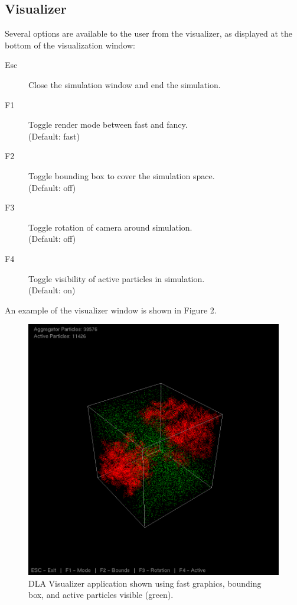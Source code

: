 \documentclass[fleqn,10pt]{SelfArx} %
\begin{document}
\subsection{Visualizer}
Several options are available to the user from the visualizer, as displayed at the bottom of the visualization window:
\begin{description}
    \item[Esc] Close the simulation window and end the simulation.
    \item[F1] Toggle render mode between fast and fancy.\\ (Default: fast)
    \item[F2] Toggle bounding box to cover the simulation space.\\ (Default: off)
    \item[F3] Toggle rotation of camera around simulation.\\ (Default: off)
    \item[F4] Toggle visibility of active particles in simulation.\\ (Default: on)
\end{description}
An example of the visualizer window is shown in Figure 2.
\begin{figure}[ht]\centering %
    \includegraphics[width=\linewidth]{DLAVisualizer.png}
    \caption{DLA Visualizer application shown using fast graphics, bounding box, and active particles visible (green).}
    \label{fig:DLAAPP}
    \end{figure}
\end{document}
